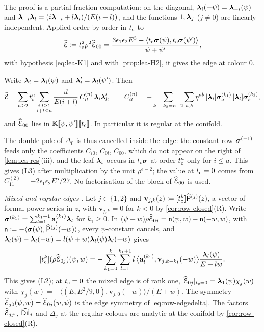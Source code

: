 The proof is a partial-fraction computation: on the diagonal, $\boldsymbol{\lambda}_i(-\psi)=\boldsymbol{\lambda}_{-i}(\psi)$ and $\boldsymbol{\lambda}_{-i}\boldsymbol{\lambda}_l=(i\boldsymbol{\lambda}_{-i}+l\boldsymbol{\lambda}_l)/(E(i+l))$, and the functions $1,\boldsymbol{\lambda}_j$ ($j\neq0$) are linearly independent. Applied order by order in $t_{\mathrm{c}}$ to
\begin{equation}\label{eq:lea-Et}
\widetilde{\mathcal{E}}\coloneqq t_{\mathrm{c}}^2\rho^2\widehat{\mathcal{E}}_{00}=\frac{3\epsilon_1\epsilon_2E^3-\langle t_{\mathrm{c}}\boldsymbol{\sigma}(\psi),t_{\mathrm{c}}\boldsymbol{\sigma}(\psi')\rangle}{\psi+\psi'},
\end{equation}
with hypothesis \eqref{eq:lea-K1} and with \cref{prop:lea-H2}, it gives the edge at colour $0$.

\begin{thm}\label{thm:lea-E00}
Write $\boldsymbol{\lambda}_i=\boldsymbol{\lambda}_i(\psi)$ and $\boldsymbol{\lambda}_l'=\boldsymbol{\lambda}_l(\psi')$. Then
\[
\widetilde{\mathcal{E}}=\sum_{n\ge2}t_{\mathrm{c}}^n\sum_{\substack{i,l\ge1\\ i+l\le n}}\frac{il}{E(i+l)}\,C^{(n)}_{il}\,\boldsymbol{\lambda}_i\boldsymbol{\lambda}_l',\qquad C^{(n)}_{il}=-\sum_{k_1+k_2=n-2}\sum_{a,b}\eta^{ab}\,[\boldsymbol{\lambda}_i]\boldsymbol{\sigma}_a^{(k_1)}\,[\boldsymbol{\lambda}_l]\boldsymbol{\sigma}_b^{(k_2)},
\]
and $\widehat{\mathcal{E}}_{00}$ lies in $\mathbb{K}[\![ \psi,\psi' ]\!][\![ t_{\mathrm{c}} ]\!]$. In particular it is regular at the conifold.
\end{thm}

The double pole of $\Delta_0$ is thus cancelled inside the edge: the constant row $\boldsymbol{\sigma}^{(-1)}$ feeds only the coefficients $C_{i0}$, $C_{0l}$, $C_{00}$, which do not appear on the right of \cref{lem:lea-res}\textup{(iii)}, and the leaf $\boldsymbol{\lambda}_i$ occurs in $t_{\mathrm{c}}\boldsymbol{\sigma}$ at order $t_{\mathrm{c}}^a$ only for $i\leq a$. This gives \textup{(L3)} after multiplication by the unit $\rho^{e-2}$; the value at $t_{\mathrm{c}}=0$ comes from $C^{(2)}_{11}=-2\epsilon_1\epsilon_2E^5/27$. No factorisation of the block of $\widehat{\mathcal{E}}_{00}$ is used.

\emph{Mixed and regular edges} . Let $j\in\{1,2\}$ and $\mathbf{v}_{j,k}(z)\coloneqq[t_{\mathrm{c}}^k]\widehat{\mathsf{P}}^{(j)}(z)$, a vector of formal power series in $z$, with $\mathbf{v}_{j,k}=0$ for $k<0$ by \cref{cor:row-closed}\textup{(R)}. Write $\boldsymbol{\sigma}^{(k_1)}=\sum_{l=1}^{k_1+1}\mathbf{a}_l^{(k_1)}\boldsymbol{\lambda}_l$ for $k_1\geq0$. In $(\psi+w)\rho\widehat{\mathcal{E}}_{0j}=\mathsf{n}(\psi,w)-\mathsf{n}(-w,w)$, with $\mathsf{n}\coloneqq-\langle\boldsymbol{\sigma}(\psi),\widehat{\mathsf{P}}^{(j)}(-w)\rangle$, every $\psi$-constant cancels, and $\boldsymbol{\lambda}_l(\psi)-\boldsymbol{\lambda}_l(-w)=l(\psi+w)\boldsymbol{\lambda}_l(\psi)\boldsymbol{\lambda}_l(-w)$ gives
\[
[t_{\mathrm{c}}^k](\rho\widehat{\mathcal{E}}_{0j})(\psi,w)=-\sum_{k_1=0}^{k}\sum_{l=1}^{k_1+1}l\,\bigl\langle\mathbf{a}_l^{(k_1)},\mathbf{v}_{j,k-k_1}(-w)\bigr\rangle\frac{\boldsymbol{\lambda}_l(\psi)}{E+lw}.
\]
This gives \textup{(L2)}; at $t_{\mathrm{c}}=0$ the mixed edge is of rank one, $\widehat{\mathcal{E}}_{0j}|_{t_{\mathrm{c}}=0}=\boldsymbol{\lambda}_1(\psi)\chi_j(w)$ with $\chi_j(w)=-\langle(E,E^2/9,0),\mathbf{v}_{j,0}(-w)\rangle/(E+w)$. The symmetry $\widehat{\mathcal{E}}_{j0}(\psi,w)=\widehat{\mathcal{E}}_{0j}(w,\psi)$ is the edge symmetry of \eqref{eq:row-edgedelta}. The factors $\widehat{\mathcal{E}}_{jj'}$, $\widehat{\mathsf{Dil}}_j$ and $\Delta_j$ at the regular colours are analytic at the conifold by \cref{cor:row-closed}\textup{(R)}.
